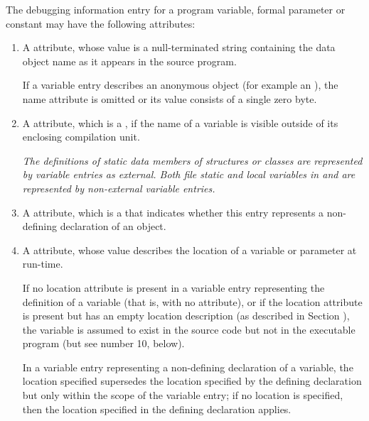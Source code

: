 The debugging information entry for a program variable,
formal parameter or constant may have the following attributes:
\begin{enumerate}[1. ]
\item A \DWATname{} attribute,
whose value is a null-terminated string containing the data object 
name as it appears in the source program.

If a variable entry describes an anonymous object (for example
an ),
the name attribute is omitted or its value consists of a single
zero byte.

\item A \DWATexternal{} attribute, 
\hypertarget{chap:DWATexternalexternalvariable}{}
which 
is a , if the name
of a variable is visible outside of its enclosing compilation
unit.  

\textit{The definitions of  static data members 
of structures or classes are represented by variable entries 
 as external. Both file static and local variables 
in  and  are represented by 
non-external variable entries.}

\item A \DWATdeclaration{} attribute, 
which is a  that
indicates whether this entry represents a non-defining
declaration of an object.

\item A \DWATlocation{} attribute,
whose value describes the location of a variable or parameter at run-time.

If no location attribute is present in a variable 
entry representing the definition of a variable (that is,
with no 
\DWATdeclaration{} attribute),
or if the location attribute is present but has
an empty location description (as described in Section 
),
the variable is assumed to exist in the source code but not
in the executable program (but see number 10, below).

In a variable entry representing a non-defining declaration 
of a variable, the location specified supersedes the location 
specified by the defining declaration but only within the
scope of the variable entry; if no location is specified, 
then the location specified in the defining declaration 
applies.


\end{enumerate}
